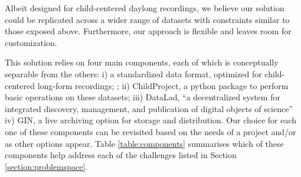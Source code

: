 \documentclass[smallextended]{svjour3}       %
\begin{document}
Albeit designed for child-centered daylong recordings, we believe our solution could be replicated across a wider range of datasets with constraints similar to those exposed above. Furthermore, our approach is flexible and leaves room for customization.

This solution relies on four main components, each of which is conceptually separable from the others: i) a standardized data format, optimized for child-centered long-form recordings; \citep{hanke_defense_2021}; ii) ChildProject, a python package to perform basic operations on these datasets; iii) DataLad, ``a decentralized system for integrated discovery, management, and publication of digital objects of science''  iv) GIN, a live archiving option for storage and distribution. Our choice for each one of these components can be revisited based on the needs of a project and/or as other options appear. Table \ref{table:components} summarises which of these components help address each of the challenges listed in Section \ref{section:problemspace}.
\end{document}
